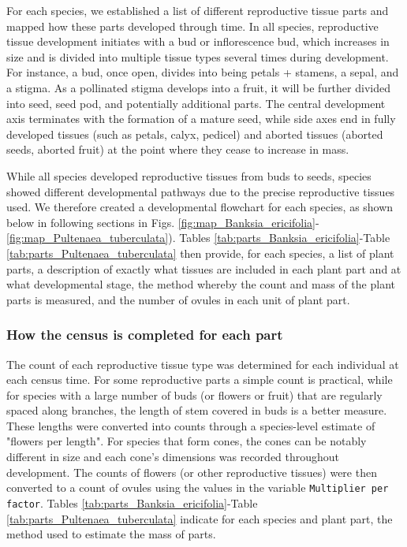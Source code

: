 \documentclass[10pt,twoside]{article}\usepackage[]{graphicx}\usepackage[]{color}
\begin{document}
For each species, we established a list of different reproductive tissue parts and mapped how these parts developed through time. In all species, reproductive tissue development initiates with a bud or inflorescence bud, which increases in size and is divided into multiple tissue types several times during development. For instance, a bud, once open, divides into being petals + stamens, a sepal, and a stigma. As a pollinated stigma develops into a fruit, it will be further divided into seed, seed pod, and potentially additional parts. The central development axis terminates with the formation of a mature seed, while side axes end in fully developed tissues (such as petals, calyx, pedicel) and aborted tissues (aborted seeds, aborted fruit) at the point where they cease to increase in mass.

While all species developed reproductive tissues from buds to seeds, species showed different developmental pathways due to the precise reproductive tissues used. We therefore created a developmental flowchart for each species, as shown below in following sections in Figs. \ref{fig:map_Banksia_ericifolia}-\ref{fig:map_Pultenaea_tuberculata}). Tables \ref{tab:parts_Banksia_ericifolia}-Table \ref{tab:parts_Pultenaea_tuberculata} then provide, for each species, a list of plant parts, a description of exactly what tissues are included in each plant part and at what developmental stage, the method whereby the count and mass of the plant parts is measured, and the number of ovules in each unit of plant part.

\subsubsection{How the census is completed for each part}

The count of each reproductive tissue type was determined for each individual at each census time. For some reproductive parts a simple count is practical, while for species with a large number of buds (or flowers or fruit) that are regularly spaced along branches, the length of stem covered in buds is a better measure. These lengths were converted into counts through a species-level estimate of "flowers per length". For species that form cones, the cones can be notably different in size and each cone's dimensions was recorded throughout development. The counts of flowers (or other reproductive tissues) were then converted to a count of ovules using the values in the variable \texttt{Multiplier per factor}. Tables \ref{tab:parts_Banksia_ericifolia}-Table \ref{tab:parts_Pultenaea_tuberculata} indicate for each species and plant part, the method used to estimate the mass of parts.
\end{document}
